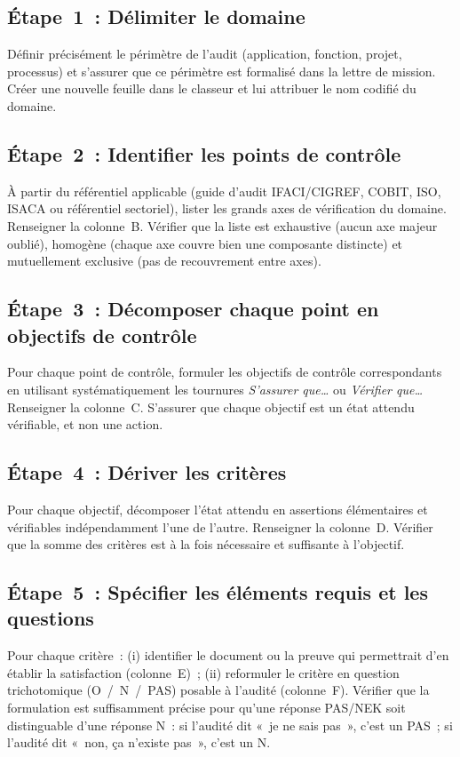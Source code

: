 \subsection{Étape~1~: Délimiter le domaine}

Définir précisément le périmètre de l'audit (application, fonction, projet,
processus) et s'assurer que ce périmètre est formalisé dans la lettre de
mission. Créer une nouvelle feuille dans le classeur et lui attribuer le nom
codifié du domaine.

\subsection{Étape~2~: Identifier les points de contrôle}

À partir du référentiel applicable (guide d'audit IFACI/CIGREF, COBIT, ISO,
ISACA ou référentiel sectoriel), lister les grands axes de vérification du
domaine. Renseigner la colonne~B. Vérifier que la liste est exhaustive (aucun
axe majeur oublié), homogène (chaque axe couvre bien une composante
distincte) et mutuellement exclusive (pas de recouvrement entre axes).

\subsection{Étape~3~: Décomposer chaque point en objectifs de contrôle}

Pour chaque point de contrôle, formuler les objectifs de contrôle correspondants
en utilisant systématiquement les tournures \emph{S'assurer que\ldots} ou
\emph{Vérifier que\ldots} Renseigner la colonne~C. S'assurer que chaque
objectif est un état attendu vérifiable, et non une action.

\subsection{Étape~4~: Dériver les critères}

Pour chaque objectif, décomposer l'état attendu en assertions élémentaires et
vérifiables indépendamment l'une de l'autre. Renseigner la colonne~D. Vérifier
que la somme des critères est à la fois nécessaire et suffisante à l'objectif.

\subsection{Étape~5~: Spécifier les éléments requis et les questions}

Pour chaque critère~: (i) identifier le document ou la preuve qui permettrait
d'en établir la satisfaction (colonne~E)~; (ii) reformuler le critère en
question trichotomique (O~/~N~/~PAS) posable à l'audité (colonne~F). Vérifier
que la formulation est suffisamment précise pour qu'une réponse PAS/NEK soit
distinguable d'une réponse N~: si l'audité dit «~je ne sais pas~», c'est un
PAS~; si l'audité dit «~non, ça n'existe pas~», c'est un N.

